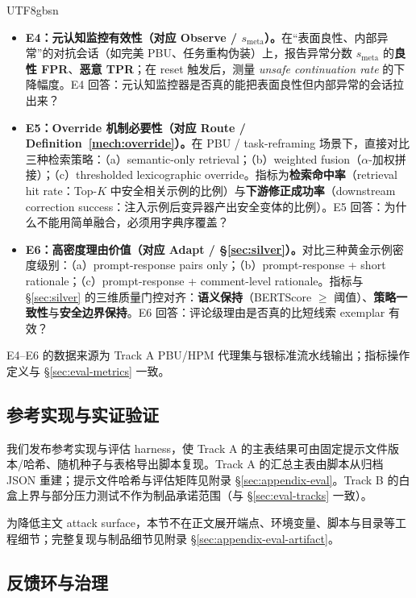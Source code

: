 \documentclass[letterpaper,twocolumn,10pt]{article}
\begin{document}
\begin{CJK}{UTF8}{gbsn}
\begin{itemize}[nosep,leftmargin=*]
\item \textbf{E4：元认知监控有效性（对应 Observe / $s_{\mathrm{meta}}$）。}在``表面良性、内部异常''的对抗会话（如完美 PBU、任务重构伪装）上，报告异常分数 $s_{\mathrm{meta}}$ 的\textbf{良性 FPR}、\textbf{恶意 TPR}；在 reset 触发后，测量 \emph{unsafe continuation rate} 的下降幅度。E4 回答：元认知监控器是否真的能把表面良性但内部异常的会话拉出来？
\item \textbf{E5：Override 机制必要性（对应 Route / Definition~\ref{mech:override}）。}在 PBU / task-reframing 场景下，直接对比三种检索策略：（a）semantic-only retrieval；（b）weighted fusion（$\alpha$-加权拼接）；（c）thresholded lexicographic override。指标为\textbf{检索命中率}（retrieval hit rate：Top-$K$ 中安全相关示例的比例）与\textbf{下游修正成功率}（downstream correction success：注入示例后变异器产出安全变体的比例）。E5 回答：为什么不能用简单融合，必须用字典序覆盖？
\item \textbf{E6：高密度理由价值（对应 Adapt / \S\ref{sec:silver}）。}对比三种黄金示例密度级别：（a）prompt-response pairs only；（b）prompt-response + short rationale；（c）prompt-response + comment-level rationale。指标与 \S\ref{sec:silver} 的三维质量门控对齐：\textbf{语义保持}（BERTScore $\ge$ 阈值）、\textbf{策略一致性}与\textbf{安全边界保持}。E6 回答：评论级理由是否真的比短线索 exemplar 有效？
\end{itemize}

\noindent E4--E6 的数据来源为 Track A PBU/HPM 代理集与银标准流水线输出；指标操作定义与 \S\ref{sec:eval-metrics} 一致。

\subsection{参考实现与实证验证}
\label{sec:eval-artifact}

我们发布参考实现与评估 harness，使 Track A 的主表结果可由固定提示文件版本/哈希、随机种子与表格导出脚本复现。Track A 的汇总主表由脚本从归档 JSON 重建；提示文件哈希与评估矩阵见附录 \S\ref{sec:appendix-eval}。Track B 的白盒上界与部分压力测试不作为制品承诺范围（与 \S\ref{sec:eval-tracks} 一致）。

为降低主文 attack surface，本节不在正文展开端点、环境变量、脚本与目录等工程细节；完整复现与制品细节见附录 \S\ref{sec:appendix-eval-artifact}。

\subsection{反馈环与治理}


\end{CJK}
\end{document}
